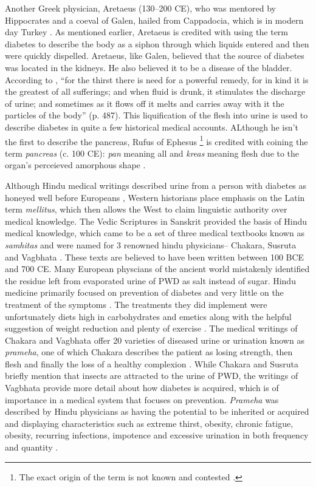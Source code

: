 \documentclass[12pt]{article}
\begin{document}
Another Greek physician, Aretaeus (130--200 CE), who was mentored by Hippocrates and a coeval of Galen, hailed from Cappadocia, which is in modern day Turkey \citep{henschen_1969_term}. As mentioned earlier, Aretaeus is credited with using the term diabetes to describe the body as a siphon through which liquids entered and then were quickly dispelled. Aretaeus, like Galen, believed that the source of diabetes was located in the kidneys. He also believed it to be a disease of the bladder. According to \citet{aretaeus_1856_extant},
``for the thirst there is need for a powerful remedy, for in kind it is the greatest of all sufferings; and when fluid is drunk, it stimulates the discharge of urine; and sometimes as it flows off it melts and carries away with it the particles of the body'' (p. 487).  This liquification of the flesh into urine is used to describe diabetes in quite a few historical medical accounts. ALthough he isn't the first to describe the pancreas, Rufus of Ephesus \footnote {The exact origin of the term is not known and contested \citep{sanders_2001_philatelic}.} is credited with coining the term \textit{pancreas} (c. 100 CE): \textit{pan} meaning all and \textit{kreas} meaning flesh due to the organ's perceieved amorphous shape \citep{papaspyros_1964_history}. 

Although Hindu medical writings described urine from a person with diabetes as honeyed well before Europeans \citep{frank_1957_diabetes}, 
Western historians place emphasis on the Latin term \textit{mellitus}, which then allows the West to claim linguistic authority over medical knowledge. The Vedic Scriptures in Sanskrit provided the basis of Hindu medical knowledge, which came to be a set of three medical textbooks known as \textit{samhitas} and were named for 3 renowned hindu physicians-- Chakara, Susruta and Vagbhata \citep{frank_1957_diabetes}. These texts are believed to have been written between 100 BCE and 700 CE.  Many European physcians of the ancient world mistakenly identified the residue left from evaporated urine of PWD as salt instead of sugar. Hindu medicine primarily focused on prevention of diabetes and very little on the treatment of the symptoms \citep{frank_1957_diabetes}. The treatments they did implement were unfortunately diets high in carbohydrates and emetics along with the helpful suggestion of weight reduction and plenty of exercise \citep{sanders_2001_philatelic}. The medical writings of Chakara and Vagbhata offer 20 varieties of diseased urine or urination known as \textit{prameha}, one of which Chakara describes the patient as losing strength, then flesh and finally the loss of a healthy complexion \citep{frank_1957_diabetes}. While Chakara and Susruta briefly mention that insects are attracted to the urine of PWD, the writings of Vagbhata provide more detail about how diabetes is acquired, which is of importance in a medical system that focuses on prevention. \textit{Prameha} was described by Hindu physicians as having the potential to be inherited or acquired and displaying characteristics \citep{frank_1957_diabetes} such as extreme thirst, obesity, chronic fatigue, obesity, recurring infections, impotence and excessive urination in both frequency and quantity \citep{frank_1957_diabetes}. 
\end{document}
